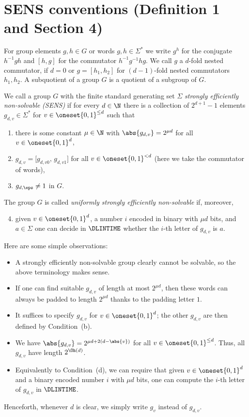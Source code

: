 \section*{SENS conventions (Definition 1 and Section 4)}
For group elements $g,h\in G$ or words $g,h\in\Sigma^*$ we write $g^h$ for the conjugate $h^{-1}gh$ and $[h,g]$ for the commutator $h^{-1}g^{-1}hg$. We call $g$ a $d$-fold nested commutator, if $d=0$ or $g=[h_1,h_2]$ for $(d-1)$-fold nested commutators $h_1,h_2$. A subquotient of a group $G$ is a quotient of a subgroup of $G$.
\begin{definition}\label{def:SENS}		
  We call a group $G$ with the finite standard generating set $\Sigma$
  \emph{strongly efficiently non-solvable} \emph{(SENS)} if for every
  $d \in \N$ there is a collection of $2^{d+1}-1$ elements
  $g_{d,v} \in \Sigma^*$ for $v \in \oneset{0,1}^{\leq d}$ such that
  \begin{enumerate}[label=(\alph*)]
  \item\label{SENSa} there is some constant $\mu \in \N$ with $\abs{g_{d,v}} = 2^{\mu d}$ for all $v \in \oneset{0,1}^{d}$,
  \item\label{SENSb} $g_{d,v} =	\bigl[ g_{d,v0},\,  g_{d,v1} \bigr]$ for all $v \in \oneset{0,1}^{< d}$ (here we take the commutator of words),
  \item\label{SENSc} $g_{d,\eps} \neq 1$ in $G$.
  \end{enumerate}
   The group $G$ is called \emph{uniformly strongly efficiently
    non-solvable} if, moreover,
  \begin{enumerate}[label=(\alph*)]
    \setcounter{enumi}{3}
  \item\label{SENSu} given $v\in \oneset{0,1}^d$, a number $i$ encoded in binary with $\mu d$ bits, and $a \in \Sigma$ one can decide in $\DLINTIME$ whether the
  	$i$-th letter of $g_{d,v}$ is $a$.
  \end{enumerate} 
\end{definition}
Here are some simple observations:
\begin{itemize}
\item A strongly efficiently non-solvable group clearly cannot
be solvable, so the above terminology makes sense.
\item If one can find suitable $g_{d,v}$ of length at most $2^{\mu d}$,  then these words can always be padded to length $2^{\mu d}$ thanks to the padding letter $1$.
\item  It suffices to specify $g_{d,v}$ for $v \in \oneset{0,1}^{d}$;
  the other $g_{d,v}$ are then defined by Condition~(b).
 \item We have $\abs{g_{d,v}} = 2^{\mu d+ 2(d-\abs{v})}$ for all $v \in \oneset{0,1}^{\leq d}$. Thus, all $g_{d,v}$ have length $2^{\Oh(d)}$.
 \item Equivalently to Condition~(d), we can require that given $v\in \oneset{0,1}^d$ and a binary encoded number $i$ with $\mu d$ bits, one can compute the $i$-th letter of $g_{d,v}$ in $\DLINTIME$.
\end{itemize}
Henceforth, whenever $d$ is clear, we simply write $g_v$ instead of $g_{d,v}$.

